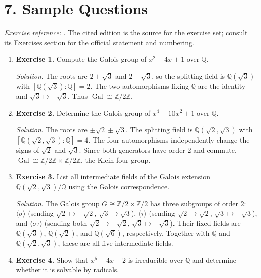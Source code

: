 \section*{7. Sample Questions}
\emph{Exercise reference:} \cite{galois_theory_ref1}. The cited edition is the source for the exercise set; consult its Exercises section for the official statement and numbering.
\begin{enumerate}[leftmargin=*,itemsep=0.9em]
\item \textbf{Exercise 1.} Compute the Galois group of $x^2-4x+1$ over $\mathbb{Q}$.

\emph{Solution.} The roots are $2+\sqrt{3}$ and $2-\sqrt{3}$, so the splitting field is $\mathbb{Q}(\sqrt{3})$ with $[\mathbb{Q}(\sqrt{3}):\mathbb{Q}]=2$. The two automorphisms fixing $\mathbb{Q}$ are the identity and $\sqrt{3}\mapsto -\sqrt{3}$. Thus $\operatorname{Gal}\cong\mathbb{Z}/2\mathbb{Z}$.

\item \textbf{Exercise 2.} Determine the Galois group of $x^4-10x^2+1$ over $\mathbb{Q}$.

\emph{Solution.} The roots are $\pm\sqrt{2}\pm\sqrt{3}$. The splitting field is $\mathbb{Q}(\sqrt{2},\sqrt{3})$ with $[\mathbb{Q}(\sqrt{2},\sqrt{3}):\mathbb{Q}]=4$. The four automorphisms independently change the signs of $\sqrt{2}$ and $\sqrt{3}$. Since both generators have order $2$ and commute, $\operatorname{Gal}\cong\mathbb{Z}/2\mathbb{Z}\times\mathbb{Z}/2\mathbb{Z}$, the Klein four-group.

\item \textbf{Exercise 3.} List all intermediate fields of the Galois extension $\mathbb{Q}(\sqrt{2},\sqrt{3})/\mathbb{Q}$ using the Galois correspondence.

\emph{Solution.} The Galois group $G\cong\mathbb{Z}/2\times\mathbb{Z}/2$ has three subgroups of order $2$: $\langle\sigma\rangle$ (sending $\sqrt{2}\mapsto-\sqrt{2}$, $\sqrt{3}\mapsto\sqrt{3}$), $\langle\tau\rangle$ (sending $\sqrt{2}\mapsto\sqrt{2}$, $\sqrt{3}\mapsto-\sqrt{3}$), and $\langle\sigma\tau\rangle$ (sending both $\sqrt{2}\mapsto-\sqrt{2}$, $\sqrt{3}\mapsto-\sqrt{3}$). Their fixed fields are $\mathbb{Q}(\sqrt{3})$, $\mathbb{Q}(\sqrt{2})$, and $\mathbb{Q}(\sqrt{6})$, respectively. Together with $\mathbb{Q}$ and $\mathbb{Q}(\sqrt{2},\sqrt{3})$, these are all five intermediate fields.

\item \textbf{Exercise 4.} Show that $x^5-4x+2$ is irreducible over $\mathbb{Q}$ and determine whether it is solvable by radicals.


\end{enumerate}
